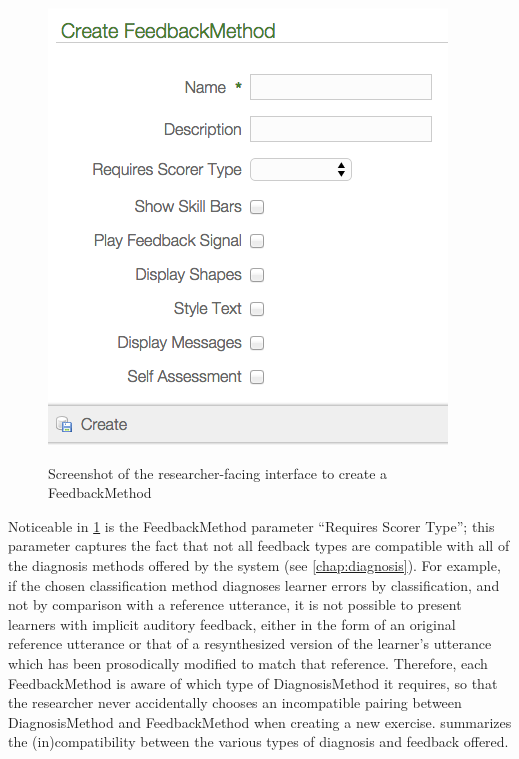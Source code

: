 	\begin{figure}
		\centering
		\caption[Creating a FeedbackMethod]{Screenshot of the researcher-facing interface to create a FeedbackMethod}
		\includegraphics[width=.8\textwidth]{img/screenshots/createFeedbackMethod}
		\label{fig:fb:createfeedbackmethod}
	\end{figure}
	
	Noticeable in \cref{fig:fb:createfeedbackmethod} is the FeedbackMethod parameter ``Requires Scorer Type''; this parameter captures the fact that not all feedback types are compatible with all of the diagnosis methods offered by the system (see \cref{chap:diagnosis}). For example, 
	if the chosen classification method diagnoses learner errors by classification,
	and not by comparison with a reference utterance, it is not possible to present learners with implicit auditory feedback, either in the form of an original reference utterance or that of a resynthesized version of the learner's utterance which has been prosodically modified to match that reference.
	Therefore, each FeedbackMethod is aware of which type of DiagnosisMethod it requires, so that the researcher never accidentally chooses an incompatible pairing between DiagnosisMethod and FeedbackMethod when creating a new exercise.  summarizes the (in)compatibility between the various types of diagnosis and feedback offered. 
	
